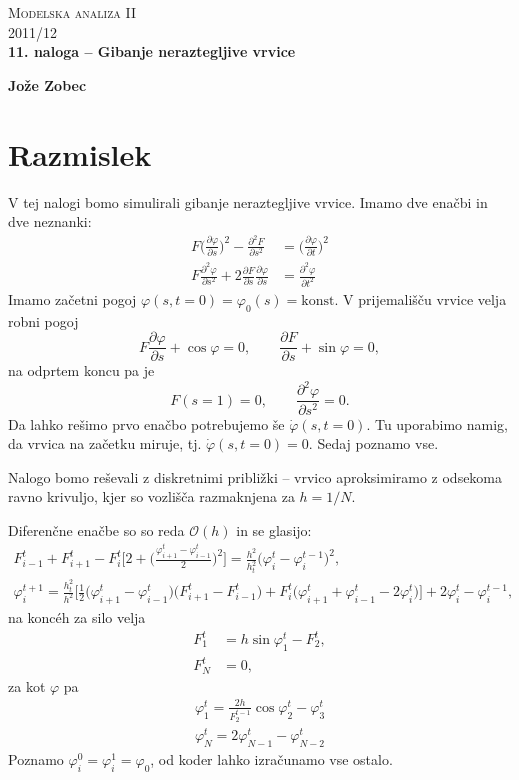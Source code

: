 \documentclass[a4 paper, 12pt]{article}
\newcommand{\vfi}{
    \ensuremath{\varphi}
}
\begin{document}
\begin{center}
\textsc{Modelska analiza II}\\
\textsc{2011/12}\\[0.5cm]
\textbf{11. naloga -- Gibanje neraztegljive vrvice}
\end{center}
\begin{flushright}
\textbf{Jože Zobec}\\
\end{flushright}

\section{Razmislek}

V tej nalogi bomo simulirali gibanje neraztegljive vrvice. Imamo dve ena\v cbi in dve neznanki:
\begin{align}
    F \bigg(\frac{\partial\varphi}{\partial s}\bigg)^2 - \frac{\partial^2 F}{\partial s^2} &=
        \bigg(\frac{\partial\varphi}{\partial t}\bigg)^2 \\
    F\frac{\partial^2\varphi}{\partial s^2} + 2\frac{\partial F}{\partial s}\frac{\partial \varphi}{\partial s} &=
        \frac{\partial^2 \varphi}{\partial t^2}
\end{align}
Imamo za\v cetni pogoj $\varphi (s,t = 0) = \varphi_0 (s) = \text{konst}$. V prijemali\v s\v cu vrvice
velja robni pogoj
\[
    F \frac{\partial \varphi}{\partial s} + \cos \varphi = 0,
        \qquad \frac{\partial F}{\partial s} + \sin \varphi = 0,
\]
na odprtem koncu pa je
\[
    F (s = 1) = 0, \qquad \frac{\partial^2 \varphi}{\partial s^2} = 0.
\]
Da lahko re\v simo prvo ena\v cbo potrebujemo \v se $\dot{\varphi}(s,t = 0)$. Tu uporabimo namig,
da vrvica na za\v cetku miruje, tj. $\dot{\varphi}(s, t = 0) = 0$. Sedaj poznamo vse.

Nalogo bomo re\v sevali z diskretnimi pribli\v zki -- vrvico aproksimiramo z odsekoma ravno krivuljo,
kjer so vozli\v s\v ca razmaknjena za $h = 1/N$.

Diferen\v cne ena\v cbe so so reda $\mathcal{O}(h)$ in se glasijo:
\begin{align}
    F^t_{i-1} + F^t_{i+1} - F^t_i\Bigg[2 + \bigg(\frac{\vfi^t_{i+1} - \vfi^t_{i-1}}{2}\bigg)^2\Bigg] =
        \frac{h^2}{h_t^2}\big(\vfi^t_i - \vfi^{t-1}_i\big)^2,
        \label{prva} \\
    \vfi^{t+1}_i = \frac{h_t^2}{h^2}\Bigg[\frac{1}{2}\big(\vfi^t_{i+1} - \vfi^t_{i-1}\big)
        \big(F^t_{i+1} - F^t_{i-1}\big) + F^t_i\big(\vfi^t_{i+1} + \vfi^t_{i-1} - 2\vfi^t_i\big)\Bigg] +
        2\vfi^t_i - \vfi^{t-1}_i,
        \label{druga}
\end{align}
na koncéh za silo velja
\begin{align}
    F^t_1 &= h\sin\vfi_1^t - F^t_2, 
    \label{F1} \\
    F^t_N &= 0,
    \label{FN}
\end{align}
za kot $\vfi$ pa
\begin{align}
    \vfi_1^t = \frac{2h}{F^{t-1}_2}\cos\vfi^t_2 - \vfi^t_3
    \label{f1} \\
    \vfi_N^t = 2\vfi^t_{N-1} - \vfi^t_{N-2}
    \label{fN}
\end{align}
Poznamo $\vfi^0_i = \vfi^1_i = \vfi_0$, od koder lahko izra\v cunamo vse ostalo.
\end{document}
